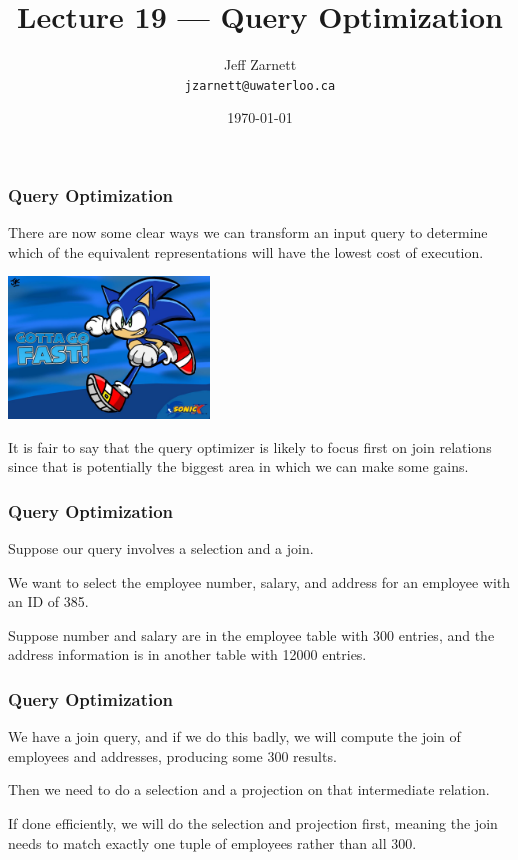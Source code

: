 

\title{Lecture 19 --- Query Optimization}

\author{Jeff Zarnett \\ \small \texttt{jzarnett@uwaterloo.ca}}
\date{\today}




\begin{frame}
  \titlepage

 \end{frame}


\begin{frame}
\frametitle{Query Optimization}

There are now some clear ways we can transform an input query to determine which of the equivalent representations will have the lowest cost of execution. 

\begin{center}
	\includegraphics[width=0.4\textwidth]{images/gottagofast.jpg}
\end{center}

It is fair to say that the query optimizer is likely to focus first on join relations since that is potentially the biggest area in which we can make some gains.

\end{frame}

\begin{frame}
\frametitle{Query Optimization}

Suppose our query involves a selection and a join. 

We want to select the employee number, salary, and address for an employee with an ID of 385. 

Suppose number and salary are in the employee table with 300 entries, and the address information is in another table with 12000 entries. 

\end{frame}

\begin{frame}
\frametitle{Query Optimization}

We have a join query, and if we do this badly, we will compute the join of employees and addresses, producing some 300 results.

Then we need to do a selection and a projection on that intermediate relation.

If done efficiently, we will do the selection and projection first, meaning the join needs to match exactly one tuple of employees rather than all 300. 

\end{frame}


